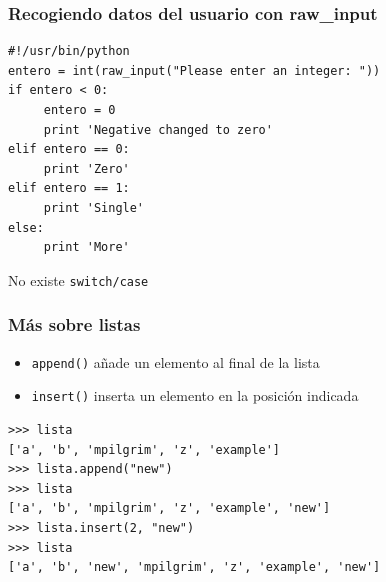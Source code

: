 \documentclass{beamer}
\begin{document}
%





\begin{frame}[fragile]
\frametitle{Recogiendo datos del usuario con raw\_input}

\begin{footnotesize}
\begin{verbatim}
#!/usr/bin/python
entero = int(raw_input("Please enter an integer: "))
if entero < 0:
     entero = 0
     print 'Negative changed to zero'
elif entero == 0:
     print 'Zero'
elif entero == 1:
     print 'Single'
else:
     print 'More'
\end{verbatim}
\end{footnotesize}
  

No existe \verb|switch/case|
\end{frame}














\begin{frame}[fragile]
\frametitle{Más sobre listas}

\begin{itemize}
\item \verb|append()| añade un elemento al final de la lista
\item \verb|insert()| inserta un elemento en la posición indicada
\end{itemize}  

\begin{footnotesize}
\begin{verbatim}
>>> lista
['a', 'b', 'mpilgrim', 'z', 'example']
>>> lista.append("new")               
>>> lista
['a', 'b', 'mpilgrim', 'z', 'example', 'new']
>>> lista.insert(2, "new")           
>>> lista
['a', 'b', 'new', 'mpilgrim', 'z', 'example', 'new']
\end{verbatim}
\end{footnotesize}


\end{frame}
\end{document}
